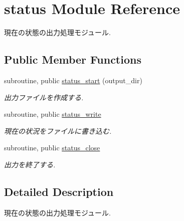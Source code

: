 \hypertarget{classstatus}{\section{status Module Reference}
\label{classstatus}
}


現在の状態の出力処理モジュール.  


\subsection*{Public Member Functions}
\begin{DoxyCompactItemize}
\item 
subroutine, public \hyperlink{classstatus_af6c30d53c06c9d37e63f7485addea26b}{status\-\_\-start} (output\-\_\-dir)
\begin{DoxyCompactList}\small\item\em 出力ファイルを作成する. \end{DoxyCompactList}\item 
\hypertarget{classstatus_ad688962536d417781c6e5e691a9aa71b}{subroutine, public \hyperlink{classstatus_ad688962536d417781c6e5e691a9aa71b}{status\-\_\-write}}\label{classstatus_ad688962536d417781c6e5e691a9aa71b}

\begin{DoxyCompactList}\small\item\em 現在の状況をファイルに書き込む. \end{DoxyCompactList}\item 
\hypertarget{classstatus_a02a6bc05bd24340901d0140cb318afa4}{subroutine, public \hyperlink{classstatus_a02a6bc05bd24340901d0140cb318afa4}{status\-\_\-close}}\label{classstatus_a02a6bc05bd24340901d0140cb318afa4}

\begin{DoxyCompactList}\small\item\em 出力を終了する. \end{DoxyCompactList}\end{DoxyCompactItemize}


\subsection{Detailed Description}
現在の状態の出力処理モジュール. 

